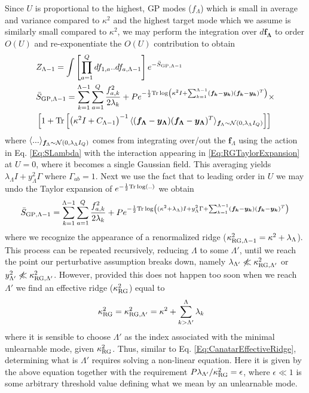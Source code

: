 Since $U$ is proportional to the highest, GP modes ($f_{\Lambda}$) which is small in average and variance compared to $\kappa^2$ and the highest target mode which we assume is similarly small compared to $\kappa^2$, we may  
 perform the integration over $d \bm{f_{\Lambda}}$ to order $O(U)$ and re-exponentiate the $O(U)$ contribution to obtain 
\begin{align}
&Z_{\Lambda-1} = \int \left[\prod_{a=1}^Q df_{1,a}..df_{a,\Lambda-1}\right] e^{-\bar{S}_{\text{GP},\Lambda-1}} \\ \nonumber 
&\bar{S}_{\text{GP},\Lambda-1} = \sum_{k=1}^{\Lambda-1} \sum_{a=1}^Q \frac{f_{a,k}^2}{2\lambda_k} + Pe^{-\frac{1}{2} \text{Tr}\log\left(\kappa^2 I+ \sum_{k=1}^{\Lambda-1} (\bm{f_k}-\bm{y_k})(\bm{f_k}-\bm{y_k})^T\right)}\times \\ \nonumber 
&\left[1+\text{Tr}\left[\left(\kappa^2 I+ C_{\Lambda-1}\right)^{-1}\langle (\bm{f_{\Lambda}}-\bm{y_{\Lambda}})(\bm{f_{\Lambda}}-\bm{y_{\Lambda}})^T\rangle_{{\bm f_{\Lambda}} \sim {\cal N}(0,\lambda_{\Lambda}I_Q)} \right]\right]
\end{align}
where $\langle ... \rangle_{\bm{f}_{\Lambda} \sim {\cal N}(0,\lambda_{\Lambda}I_Q)}$ comes from integrating over/out the ${\bm f}_{\Lambda}$ using the action in Eq. \ref{Eq:SLambda} with the interaction appearing in \ref{Eq:RGTaylorExpansion} at $U=0$, where it becomes a single Gaussian field. This averaging yields $\lambda_{\Lambda} I + y^2_{\Lambda} \Gamma$ where $\Gamma_{ab}=1$. Next we use the fact that to leading order in $U$ we may undo the Taylor expansion of $e^{-\frac{1}{2}\text{Tr}\log(..)}$ we obtain 
\begin{align}
\bar{S}_{\text{GP},\Lambda-1} = \sum_{k=1}^{\Lambda-1} \sum_{a=1}^Q \frac{f_{a,k}^2}{2\lambda_k} + Pe^{-\frac{1}{2} \text{Tr}\log\left((\kappa^2+\lambda_{\Lambda}) I+ y^2_{\Lambda}\Gamma + \sum_{k=1}^{\Lambda-1} (\bm{f_k}-\bm{y_k})(\bm{f_k}-\bm{y_k})^T\right)}
\end{align}
where we recognize the appearance of a renormalized ridge ($\kappa^2_{\text{RG},\Lambda-1}=\kappa^2+\lambda_{\Lambda}$). 
This process can be repeated recursively, reducing $\Lambda$ to some $\Lambda'$, until we reach the point our perturbative assumption breaks down, namely $\lambda_{\Lambda'} \not \ll \kappa^2_{\text{RG},\Lambda'}$ or $y_{\Lambda'}^2 \not \ll \kappa^2_{\text{RG},\Lambda'}$. However, provided this does not happen too soon when we reach $\Lambda'$ we find an effective ridge ($\kappa^2_{\text{RG}}$) equal to 
\begin{align}
\label{Eq:Effective_Ridge_RG}
\kappa_{\text{RG}}^2 &= \kappa^2_{\text{RG},\Lambda'} =   \kappa^2+\sum_{k>\Lambda'}^{\Lambda}\lambda_k 
\end{align}
where it is sensible to choose $\Lambda'$ as the index associated with the minimal unlearnable mode, given $\kappa_{\text{RG}}^2$. Thus, similar to Eq. \ref{Eq:CanatarEffectiveRidge}, determining what is $\Lambda'$ requires solving a non-linear equation. Here it is given by the above equation together with the requirement $P\lambda_{\Lambda'}/\kappa_{\text{RG}}^2 = \epsilon$, where $\epsilon \ll 1$ is some arbitrary threshold value defining what we mean by an unlearnable mode.  

